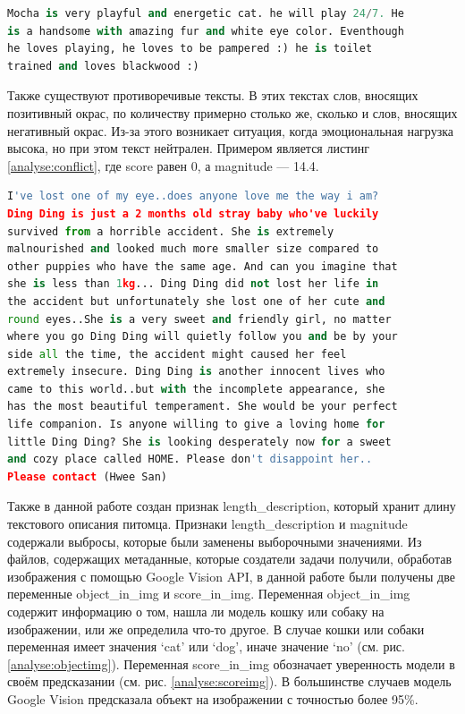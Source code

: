 \documentclass[14pt]{mmcs_article}
\begin{document}
\begin{lstlisting}[language=Python, caption={Пример позитивно окрашенного текста}, label=analyse:pos]
Mocha is very playful and energetic cat. he will play 24/7. He 
is a handsome with amazing fur and white eye color. Eventhough 
he loves playing, he loves to be pampered :) he is toilet 
trained and loves blackwood :)
\end{lstlisting}

Также существуют противоречивые тексты. В этих текстах слов, вносящих позитивный окрас, по количеству примерно столько же, сколько и слов, вносящих негативный окрас. Из-за этого возникает ситуация, когда эмоциональная нагрузка высока, но при этом текст нейтрален. Примером является листинг \ref{analyse:conflict}, где score равен 0, а magnitude — 14.4.

\begin{lstlisting}[language=Python, caption={Пример противоречивого текста}, label=analyse:conflict]
I've lost one of my eye..does anyone love me the way i am? 
Ding Ding is just a 2 months old stray baby who've luckily 
survived from a horrible accident. She is extremely 
malnourished and looked much more smaller size compared to 
other puppies who have the same age. And can you imagine that 
she is less than 1kg... Ding Ding did not lost her life in 
the accident but unfortunately she lost one of her cute and 
round eyes..She is a very sweet and friendly girl, no matter 
where you go Ding Ding will quietly follow you and be by your 
side all the time, the accident might caused her feel 
extremely insecure. Ding Ding is another innocent lives who 
came to this world..but with the incomplete appearance, she 
has the most beautiful temperament. She would be your perfect 
life companion. Is anyone willing to give a loving home for 
little Ding Ding? She is looking desperately now for a sweet 
and cozy place called HOME. Please don't disappoint her.. 
Please contact (Hwee San)
\end{lstlisting}

Также в данной работе создан признак length\_description, который хранит длину текстового описания питомца. Признаки length\_description и magnitude содержали выбросы, которые были заменены выборочными значениями.
Из файлов, содержащих метаданные, которые создатели задачи получили, обработав изображения с помощью Google Vision API, в данной работе были получены две переменные object\_in\_img и score\_in\_img. Переменная object\_in\_img содержит информацию о том, нашла ли модель кошку или собаку на изображении, или же определила что-то другое. В случае кошки или собаки переменная имеет значения `cat' или `dog', иначе значение `no' (см. рис. \ref{analyse:objectimg}). Переменная score\_in\_img обозначает уверенность модели в своём предсказании (см. рис. \ref{analyse:scoreimg}). В большинстве случаев модель Google Vision предсказала объект на изображении с точностью более 95\%.
\end{document}
